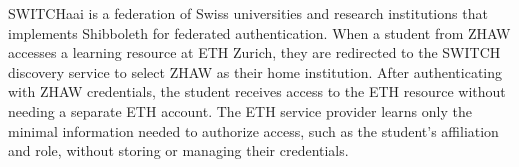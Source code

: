 \begin{example}
SWITCHaai is a federation of Swiss universities and research institutions that implements Shibboleth for federated authentication. When a student from ZHAW accesses a learning resource at ETH Zurich, they are redirected to the SWITCH discovery service to select ZHAW as their home institution. After authenticating with ZHAW credentials, the student receives access to the ETH resource without needing a separate ETH account. The ETH service provider learns only the minimal information needed to authorize access, such as the student's affiliation and role, without storing or managing their credentials.
\end{example}


